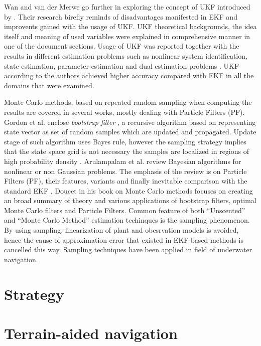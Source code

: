 Wan and van der Merwe \cite{wan00} go further in exploring the concept of UKF introduced by \cite{julier96}. Their research birefly reminds of disadvantages manifested in EKF and improvents gained with the usage of UKF. UKF theoretical backgrounds, the idea itself and meaning of used variables were explained in comprehensive manner in one of the document sections. Usage of UKF was reported together with the results in different estimation problems such as nonlinear system identification, state estimation, parameter estimation and dual estimation problems \cite{wan00}. UKF according to the authors achieved higher accuracy compared with EKF in all the domains that were examined.

Monte Carlo methods, based on repeated random sampling when computing the results are covered in several works, mostly dealing with Particle Filters (PF). Gordon et al. enclose \textit{bootstrap filter} \cite{gordon93}, a recursive algorithm based on representing state vector as set of random samples which are updated and propagated. Update stage of such algorithm uses Bayes rule, however the sampling strategy implies that the state space grid is not necessary the samples are localized in regions of high probability density \cite{gordon93}. Arulampalam et al. review Bayesian algorithms for nonlinear or non Gaussian problems. The emphasis of the review is on Particle Filters (PF), their features, variants and finally inevitable comparison with the standard EKF \cite{arulampalam02}. Doucet in his book on Monte Carlo methods \cite{doucet01} focuses on creating an broad summary of theory and various applications of bootstrap filters, optimal Monte Carlo filters and Particle Filters. Common feature of both ``Unscented'' and ``Monte Carlo Method'' estimation techinques is the sampling phenomenon. By using sampling, linearization of plant and obesrvation models is avoided, hence the cause of approximation error that existed in EKF-based methods is cancelled this way. Sampling techniques have been applied in field of underwater navigation.  

\section{Strategy}  
\section{Terrain-aided navigation} \label{sec:terrain-aided}

